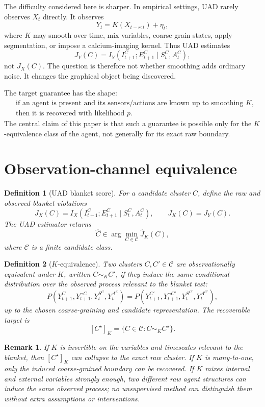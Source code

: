 \documentclass[10pt]{article}
\newtheorem{definition}{Definition}
\newtheorem{remark}{Remark}
\newcommand{\MI}{I}
\newcommand{\cC}{\mathcal{C}}
\begin{document}
The difficulty considered here is sharper. In empirical settings, UAD rarely observes \(X_t\) directly. It observes
\begin{equation}
Y_t = K(X_{t-r:t})+\eta_t,
\label{eq:obs_channel}
\end{equation}
where \(K\) may smooth over time, mix variables, coarse-grain states, apply segmentation, or impose a calcium-imaging kernel. Thus UAD estimates
\[
J_Y(C)
=
\MI_Y(I^C_{t+1};E^C_{t+1}\mid S^C_t,A^C_t),
\]
not \(J_X(C)\). The question is therefore not whether smoothing adds ordinary noise. It changes the graphical object being discovered.

The target guarantee has the shape:
\begin{align*}
&\text{if an agent is present and its sensors/actions are known up to smoothing }K, \\
&\text{then it is recovered with likelihood }p.
\end{align*}
The central claim of this paper is that such a guarantee is possible only for the \(K\)-equivalence class of the agent, not generally for its exact raw boundary.

\section{Observation-channel equivalence}

\begin{definition}[UAD blanket score]
For a candidate cluster \(C\), define the raw and observed blanket violations
\[
J_X(C)=\MI_X(I^C_{t+1};E^C_{t+1}\mid S^C_t,A^C_t),
\qquad
J_K(C)=J_Y(C).
\]
The UAD estimator returns
\[
\hat C
\in
\arg\min_{C\in\cC}\hat J_K(C),
\]
where \(\cC\) is a finite candidate class.
\end{definition}

\begin{definition}[\(K\)-equivalence]
Two clusters \(C,C'\in\cC\) are observationally equivalent under \(K\), written \(C\sim_K C'\), if they induce the same conditional distribution over the observed process relevant to the blanket test:
\[
P(Y_{t+1}^{C},Y_{t+1}^{\neg C},Y_t^{S^C},Y_t^{A^C})
=
P(Y_{t+1}^{C'},Y_{t+1}^{\neg C'},Y_t^{S^{C'}},Y_t^{A^{C'}}),
\]
up to the chosen coarse-graining and candidate representation. The recoverable target is
\[
[C^\star]_K=\{C\in\cC:C\sim_K C^\star\}.
\]
\end{definition}

\begin{remark}
If \(K\) is invertible on the variables and timescales relevant to the blanket, then \([C^\star]_K\) can collapse to the exact raw cluster. If \(K\) is many-to-one, only the induced coarse-grained boundary can be recovered. If \(K\) mixes internal and external variables strongly enough, two different raw agent structures can induce the same observed process; no unsupervised method can distinguish them without extra assumptions or interventions.
\end{remark}
\end{document}
